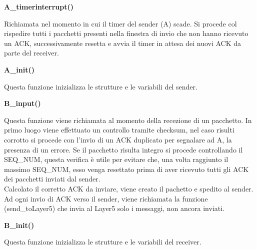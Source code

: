 \documentclass[a4paperr]{article}
\begin{document}
\begin{flushleft}
\textbf{A\_timerinterrupt()}
\end{flushleft}
Richiamata nel momento in cui il timer del sender (A) scade. Si procede col rispedire tutti i pacchetti presenti nella finestra di invio che non hanno ricevuto un ACK, successivamente resetta e avvia il timer in attesa dei nuovi ACK da parte del receiver.

\begin{flushleft}
\textbf{A\_init()}
\end{flushleft}
Questa funzione inizializza le strutture e le variabili del sender.

\begin{flushleft}
\textbf{B\_input()}
\end{flushleft}
Questa funzione viene richiamata al momento della recezione di un pacchetto. In primo luogo viene effettuato un controllo tramite checksum, nel caso risulti corrotto si procede con l'invio di un ACK duplicato per segnalare ad A, la presenza di un errore. Se il pacchetto risulta integro si procede controllando il SEQ\_NUM, questa verifica è utile per evitare che, una volta raggiunto il massimo SEQ\_NUM, esso venga resettato prima di aver ricevuto tutti gli ACK dei pacchetti inviati dal sender. \\ Calcolato il corretto ACK da inviare, viene creato il pachetto e spedito al sender. Ad ogni invio di ACK verso il sender, viene richiamata la funzione (send\_toLayer5) che invia al Layer5 solo i messaggi, non ancora inviati. 

\begin{flushleft}
\textbf{B\_init()}
\end{flushleft}
Questa funzione inizializza le strutture e le variabili del receiver.
 
\end{document}
